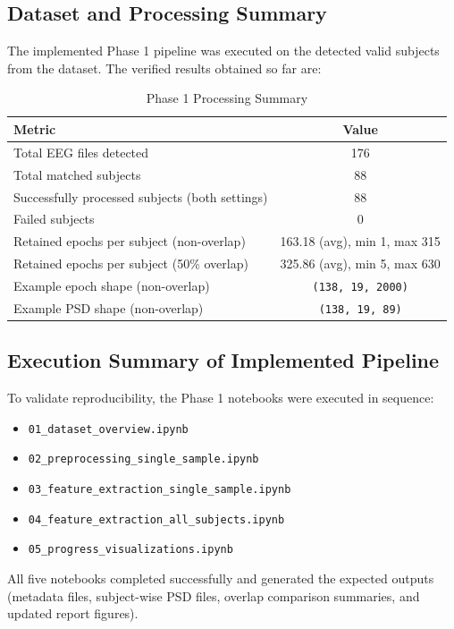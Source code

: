 \documentclass[12pt,a4paper]{article}
\begin{document}
\subsection{Dataset and Processing Summary}
The implemented Phase 1 pipeline was executed on the detected valid subjects from the dataset. The verified results obtained so far are:

\begin{table}[H]
\centering
\caption{Phase 1 Processing Summary}
\begin{tabular}{lc}
\toprule
\textbf{Metric} & \textbf{Value} \\
\midrule
Total EEG files detected & 176 \\
Total matched subjects & 88 \\
Successfully processed subjects (both settings) & 88 \\
Failed subjects & 0 \\
Retained epochs per subject (non-overlap) & 163.18 (avg), min 1, max 315 \\
Retained epochs per subject (50\% overlap) & 325.86 (avg), min 5, max 630 \\
Example epoch shape (non-overlap) & \texttt{(138, 19, 2000)} \\
Example PSD shape (non-overlap) & \texttt{(138, 19, 89)} \\
\bottomrule
\end{tabular}
\end{table}

\subsection{Execution Summary of Implemented Pipeline}
To validate reproducibility, the Phase 1 notebooks were executed in sequence:
\begin{itemize}
    \item \texttt{01\_dataset\_overview.ipynb}
    \item \texttt{02\_preprocessing\_single\_sample.ipynb}
    \item \texttt{03\_feature\_extraction\_single\_sample.ipynb}
    \item \texttt{04\_feature\_extraction\_all\_subjects.ipynb}
    \item \texttt{05\_progress\_visualizations.ipynb}
\end{itemize}

All five notebooks completed successfully and generated the expected outputs (metadata files, subject-wise PSD files, overlap comparison summaries, and updated report figures).
\end{document}
